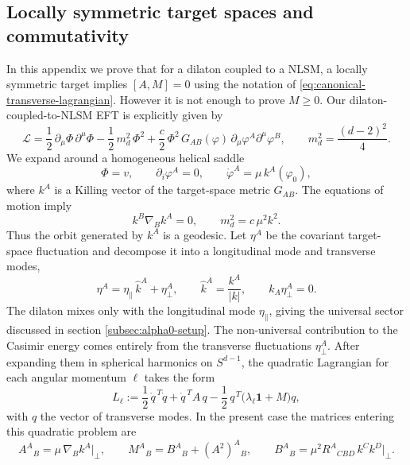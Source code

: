 \documentclass[a4paper,11pt]{article}
\begin{document}
\begin{appendix}

\section{Locally symmetric target spaces and commutativity}\label{app:locally-symmetric}

In this appendix we prove that for a dilaton coupled to a NLSM, a locally symmetric target implies $[A,M]=0$ using the notation of \eqref{eq:canonical-transverse-lagrangian}. However it is not enough to prove $M\geq0$. Our dilaton-coupled-to-NLSM EFT is explicitly given by
\begin{equation}
\mathcal L
=
\frac12\,\partial_\mu\Phi\,\partial^\mu\Phi
-\frac12\,m_d^2\,\Phi^2
+\frac c2\,\Phi^2\,G_{AB}(\varphi)\,\partial_\mu\varphi^A\partial^\mu\varphi^B,
\qquad
m_d^2=\frac{(d-2)^2}{4}.
\end{equation}
We expand around a homogeneous helical saddle
\begin{equation}
  \Phi=v, \qquad \partial_i\varphi^A=0, \qquad \dot\varphi^A=\mu\,k^A(\varphi_0),
\end{equation}
where $k^A$ is a Killing vector of the target-space metric $G_{AB}$.
The equations of motion imply
\begin{equation}
  k^B\nabla_B k^A=0, \qquad m_d^2=c\,\mu^2 k^2.
\end{equation}
Thus the orbit generated by $k^A$ is a geodesic.
Let $\eta^A$ be the covariant target-space fluctuation and decompose it into a longitudinal mode and transverse modes,
\begin{equation}
\eta^A=\eta_\parallel\,\hat k^A+\eta_\perp^A,
\qquad
\hat k^A=\frac{k^A}{|k|},
\qquad
k_A\eta_\perp^A=0.
\end{equation}
The dilaton mixes only with the longitudinal mode $\eta_\parallel$, giving the universal sector discussed in section \ref{subsec:alpha0-setup}. The non-universal contribution to the Casimir energy comes entirely from the transverse fluctuations $\eta_\perp^A$. After expanding them in spherical harmonics on $S^{d-1}$, the quadratic Lagrangian for each angular momentum $\ell$ takes the form
\begin{equation}
  L_\ell := \frac12\,\dot q^{\,T}\dot q +\dot q^{\,T}A\,q -\frac12\,q^{\,T}\bigl(\lambda_\ell \mathbf 1 + M\bigr)q,
\end{equation}
with $q$ the vector of transverse modes. In the present case the matrices entering this quadratic problem are
\begin{equation}
A^A{}_B=\mu\,\nabla_B k^A\big|_{\perp},
\qquad
M^A{}_B=B^A{}_B+(A^2)^A{}_B,
\qquad
B^A{}_B=\mu^2 R^A{}_{CBD}\,k^C k^D\big|_{\perp}.
\label{eq:appendix-ABM}
\end{equation}



\end{appendix}
\end{document}
